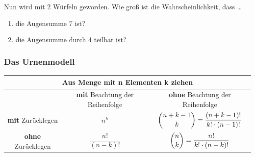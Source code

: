 \documentclass[11pt, a4paper]{article}
\newcommand{\abs}[1]{\left\lvert#1\right\rvert}
\newif\ifshowsolution
\begin{document}
Nun wird mit 2 Würfeln geworden. Wie groß ist die Wahrscheinlichkeit, dass \dots \\
\begin{enumerate}
	\item die Augensumme 7 ist?
	
	\ifshowsolution
		Ereignisraum $\Omega = \left\{(1,1)\ (1,2)\dots (6,5)\ (6,6)\ (6,6)\ (5,6)\dots (2,1)\ (1,1)\right\}, \quad \abs{\Omega} = 36$ \\
		$E = \{(1,6)\ (6,1)\ (2,5)\ (5,2)\ (3,4)\ (4,3)\}, \quad \abs{E} = 6$ \\
		$\frac{\abs{E}}{\abs{\Omega}} = \frac{6}{36} = \frac{1}{6}$
	\fi
	
	\item die Augensumme durch 4 teilbar ist?
	
	\ifshowsolution
		Ereignisraum $\Omega = \left\{(1,1)\ (1,2)\dots (6,5)\ (6,6)\ (6,6)\ (5,6)\dots (2,1)\ (1,1)\right\}, \quad \abs{\Omega} = 36$ \\
		Maximum: $6+6 = 12$, Vielfache $\leq 12$ von 4: $\{4, 8, 12\}$ \\
		$E_4 = \{(1,3)\ (2,2)\ (3,1)\}, \quad \abs{E_4} = 3$ \\
		$E_8 = \{(2,6)\ (3,5)\ (4,4)\ (5,3)\ (6,2)\}, \quad \abs{E_8} = 5$ \\
		$E_{12} = \{(6,6)\}, \quad \abs{E_{12}} = 1$ \\
		$\abs{E_{\text{gesammt}}} = \abs{E_4} + \abs{E_8} + \abs{E_{12}} = 9$ (Weil disjunkt) \\
		$\frac{\abs{E_{\text{gesammt}}}}{\abs{\Omega}} = \frac{9}{36} = \frac{1}{4}$
	\fi
\end{enumerate}

\subsubsection{Das Urnenmodell}
\begin{tabular}{|c|c|c|}
	\hline
	\multicolumn{3}{|c|}{Aus Menge mit \textbf{n} Elementen \textbf{k} ziehen} \\
	\hline
	 & \textbf{mit} Beachtung der Reihenfolge & \textbf{ohne} Beachtung der Reihenfolge \\
	\hline
	\textbf{mit} Zurücklegen & $n^k$ & $\dbinom{n+k-1}{k} = \dfrac{(n+k-1)!}{k!\cdot (n-1)!}$ \\
	\hline
	\textbf{ohne} Zurücklegen & $\dfrac{n!}{(n-k)!}$ & $\dbinom{n}{k} = \dfrac{n!}{k!\cdot (n-k)!}$ \\
	\hline
\end{tabular}
\end{document}
